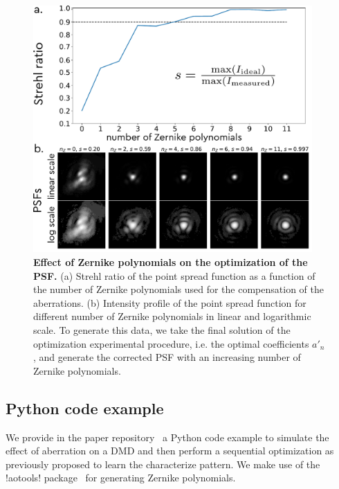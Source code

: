 \documentclass[12pt]{iopart}
\begin{document}
\begin{figure}
  \centering
  \includegraphics[width = 0.95\textwidth]{images/Zernike_2.pdf}
  \caption{
    \textbf{Effect of Zernike polynomials on the optimization of the PSF.}
    (a) Strehl ratio of the point spread function as a function of the number of Zernike polynomials used
    for the compensation of the aberrations.
    (b) Intensity profile of the point spread function for different number of Zernike polynomials
    in linear and logarithmic scale.
    To generate this data, we take the final solution of the optimization experimental procedure,
    i.e. the optimal coefficients $a'_n$,
    and generate the corrected PSF with an increasing number of Zernike polynomials.
  }
  \label{fig:zernike}
\end{figure}


\subsection{Python code example}

We provide in the paper repository~\cite{github} a Python code example
to simulate the effect of aberration on a DMD
and then perform a sequential optimization as previously proposed
to learn the characterize pattern.
We make use of the !aotools! package~\cite{Townson2019aotools} for generating Zernike polynomials.

\end{document}
